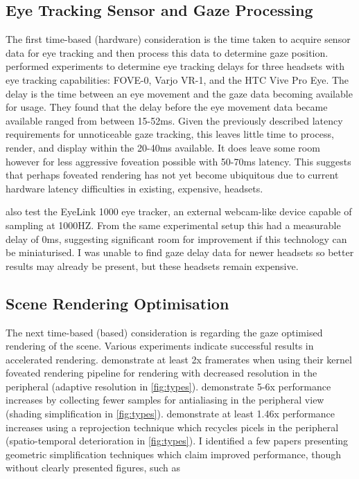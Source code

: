 \documentclass[a4paper,11pt]{article}
\begin{document}
\subsection{Eye Tracking Sensor and Gaze Processing}
The first time-based (hardware) consideration is the time taken to acquire sensor data for eye tracking and then process this data to determine gaze position. \textcite{stein2021comparison} performed experiments to determine eye tracking delays for three headsets with eye tracking capabilities: FOVE-0, Varjo VR-1, and the HTC Vive Pro Eye. The delay is the time between an eye movement and the gaze data becoming available for usage. They found that the delay before the eye movement data became available ranged from between 15-52ms. Given the previously described latency requirements for unnoticeable gaze tracking, this leaves little time to process, render, and display within the 20-40ms available. It does leave some room however for less aggressive foveation possible with 50-70ms latency. This suggests that perhaps foveated rendering has not yet become ubiquitous due to current hardware latency difficulties in existing, expensive, headsets.

\textcite{stein2021comparison} also test the EyeLink 1000 eye tracker, an external webcam-like device capable of sampling at 1000HZ. From the same experimental setup this had a measurable delay of 0ms, suggesting significant room for improvement if this technology can be miniaturised. I was unable to find gaze delay data for newer headsets so better results may already be present, but these headsets remain expensive.

\subsection{Scene Rendering Optimisation}
\label{scene_rendering_optim}
The next time-based (based) consideration is regarding the gaze optimised rendering of the scene. Various experiments indicate successful results in accelerated rendering. \textcite{meng2018kernel} demonstrate at least 2x framerates when using their kernel foveated rendering pipeline for rendering with decreased resolution in the peripheral (adaptive resolution in \cref{fig:types}). \textcite{guenter2012foveated} demonstrate 5-6x performance increases by collecting fewer samples for antialiasing in the peripheral view (shading simplification in \cref{fig:types}). \textcite{weier2016foveated} demonstrate at least 1.46x performance increases using a reprojection technique which recycles picels in the peripheral (spatio-temporal deterioration in \cref{fig:types}). I identified a few papers presenting geometric simplification techniques which claim improved performance, though without clearly presented figures, such as \textcite{tiwary2020accelerated,zheng2018perceptual}
\end{document}
